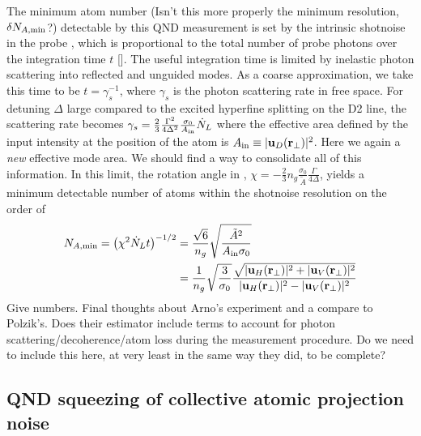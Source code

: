 \documentclass[preprint,aps,pra,onecolumn]{revtex4-1} %
\newcommand{\change}[1]{{\color{RoyalBlue} #1}}
\newcommand{\comment}[1]{{\color{Maroon} #1}}
\newcommand{\error}[1]{{\color{red} #1}}
\begin{document}
{The minimum atom number \comment{(Isn't this more properly the minimum resolution, $\delta N_{A,{\rm min}}$?)} detectable by this QND measurement is set by the intrinsic shotnoise in the probe \cite{smith_faraday_2003}, which is proportional to the total number of probe photons over the integration time $t$ [].  The useful integration time is limited by inelastic photon scattering into reflected and unguided modes. As a coarse approximation, we take this time to be $t=\gamma_s^{-1}$, where $\gamma_s$ is the photon scattering rate in free space.  For detuning $\Delta$ large compared to the excited hyperfine splitting on the D2 line, the scattering rate becomes \error{$\gamma_s =  \frac{2}{3} \frac{\Gamma^2}{4 \Delta^2}\frac{\sigma_0 }{A_{\rm in}} \dot{N}_L $} \cite{deutsch_quantum_2010} where the effective area defined by the input intensity at the position of the atom is \error{$A_{\rm in} \equiv  |\mathbf{u}_{D}(\mathbf{r}_\perp)|^2$}.  \comment{ Here we again a \emph{new} effective mode area.  We should find a way to consolidate all of this information.}  In this limit, the rotation angle in , $\chi = - \frac{2}{3} n_g  \frac{\sigma_0}{\tilde{A}}\frac{\Gamma}{4\Delta}$, yields a minimum detectable number of atoms within the shotnoise resolution on the order of
	\begin{align}
		N_{A, {\rm min}} = \big( \chi^2 \dot{N}_L t \big)^{-1/2}  &= \frac{\sqrt{6}}{n_g} \sqrt {\frac{\tilde{A}^2}{A_{\rm in} \sigma_0}}  \\ 
		&= \frac{1}{n_g} \sqrt{\frac{3}{\sigma_0 } } \frac{ \sqrt {|\mathbf{u}_H(\mathbf{r}_\perp)|^2 + |\mathbf{u}_V(\mathbf{r}_\perp)|^2} }{|\mathbf{u}_H(\mathbf{r}_\perp)|^2 - |\mathbf{u}_V(\mathbf{r}_\perp)|^2 }  
	\end{align}
}
{\color{red}  Give numbers}. \comment{Final thoughts about Arno's experiment and a compare to Polzik's.  Does their estimator include terms to account for photon scattering/decoherence/atom loss during the measurement procedure.  Do we need to include this here, at very least in the same way they did, to be complete?}

\change{
\subsection{QND squeezing of collective atomic projection noise}
}
\end{document}
